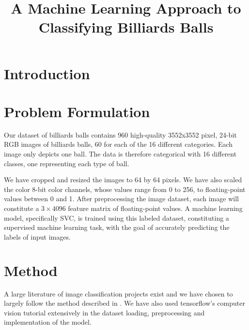 \documentclass{article}
\begin{document}

\title{A Machine Learning Approach to Classifying Billiards Balls}
\maketitle

\section{Introduction}

\section{Problem Formulation}
\label{sec:problem_formulation}
Our dataset of billiards balls contains 960 high-quality 3552x3552 pixel, 24-bit RGB images of billiards balls, 60 for each of the 16 different categories. 
Each image only depicts one ball. The data is therefore categorical with 16 different classes, one representing each type of ball.


We have cropped and resized the images to 64 by 64 pixels. We have also scaled the color 8-bit color channels, whose values range from 0 to 256, 
to floating-point values between 0 and 1. After preprocessing the image dataset, each image will constitute a $3\times 4096$ feature matrix of floating-point values. 
A machine learning model, specifically SVC, is trained using this labeled dataset, constituting a supervised machine learning task, with the goal of accurately predicting the labels of input images. 

\section{Method}
\label{sec:method}
A large literature of image classification projects exist and we have chosen to largely follow the method described in \cite{unknownMachineLearningApproach2023}.
We have also used tensorflow's computer vision tutorial extensively in the dataset loading, preprocessing and implementation of the model.\cite{ComputerVisionTensorFlow}
\end{document}
